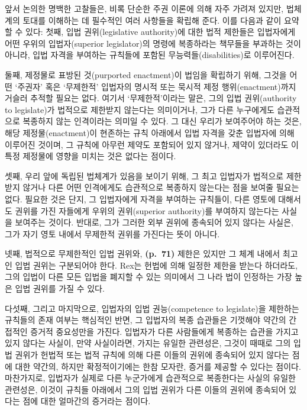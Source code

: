 앞서 논의한 명백한 고찰들은, 비록 단순한 주권 이론에 의해 자주 가려져
있지만, 법체계의 토대를 이해하는 데 필수적인 여러 사항들을 확립해 준다.
이를 다음과 같이 요약할 수 있다: 첫째, 입법 권위(legislative
authority)에 대한 법적 제한들은 입법자에게 어떤 우위의 입법자(superior
legislator)의 명령에 복종하라는 책무들을 부과하는 것이 아니라, 입법
자격을 부여하는 규칙들에 포함된 무능력들(disabilities)로 이루어진다.

둘째, 제정물로 표방된 것(purported enactment)이 법임을 확립하기 위해,
그것을 어떤 ‘주권자’ 혹은 ‘무제한적’ 입법자의 명시적 또는 묵시적 제정
행위(enactment)까지 거슬러 추적할 필요는 없다. 여기서 ‘무제한적’이라는
말은, 그의 입법 권위(authority to legislate)가 법적으로 제한받지
않는다는 의미이거나, 그가 다른 누구에게도 습관적으로 복종하지 않는
인격이라는 의미일 수 있다. 그 대신 우리가 보여주어야 하는 것은, 해당
제정물(enactment)이 현존하는 규칙 아래에서 입법 자격을 갖춘 입법자에
의해 이루어진 것이며, 그 규칙에 아무런 제약도 포함되어 있지 않거나,
제약이 있더라도 이 특정 제정물에 영향을 미치는 것은 없다는 점이다.

셋째, 우리 앞에 독립된 법체계가 있음을 보이기 위해, 그 최고 입법자가
법적으로 제한받지 않거나 다른 어떤 인격에게도 습관적으로 복종하지
않는다는 점을 보여줄 필요는 없다. 필요한 것은 단지, 그 입법자에게 자격을
부여하는 규칙들이, 다른 영토에 대해서도 권위를 가진 자들에게 우위의
권위(superior authority)를 부여하지 않는다는 사실을 보여주는 것이다.
반대로, 그가 그러한 외부 권위에 종속되어 있지 않다는 사실은, 그가 자기
영토 내에서 무제한적 권위를 가진다는 뜻이 아니다.

넷째, 법적으로 무제한적인 입법 권위와, \textbf{(p.~71)} 제한은 있지만 그
체계 내에서 최고인 입법 권위는 구분되어야 한다. Rex는 헌법에 의해 일정한
제한을 받는다 하더라도, 그의 입법이 다른 모든 입법을 폐지할 수 있는
의미에서 그 나라 법이 인정하는 가장 높은 입법 권위를 가질 수 있다.

다섯째, 그리고 마지막으로, 입법자의 입법 권능(competence to legislate)을
제한하는 규칙들의 존재 여부는 핵심적인 반면, 그 입법자의 복종 습관들은
기껏해야 약간의 간접적인 증거적 중요성만을 가진다. 입법자가 다른
사람들에게 복종하는 습관을 가지고 있지 않다는 사실이, 만약 사실이라면,
가지는 유일한 관련성은, 그것이 때때로 그의 입법 권위가 헌법적 또는 법적
규칙에 의해 다른 이들의 권위에 종속되어 있지 않다는 점에 대한 약간의,
하지만 확정적이기에는 한참 모자란, 증거를 제공할 수 있다는 점이다.
마찬가지로, 입법자가 실제로 다른 누군가에게 습관적으로 복종한다는 사실의
유일한 관련성은, 이것이 규칙들 아래에서 그의 입법 권위가 다른 이들의
권위에 종속되어 있다는 점에 대한 얼마간의 증거라는 점이다.

